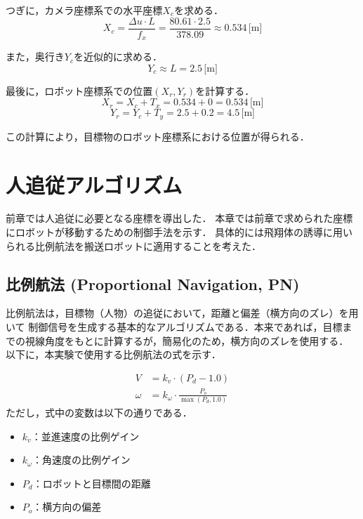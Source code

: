 つぎに，カメラ座標系での水平座標$X_c$を求める．
\begin{equation}
    X_c = \frac{\Delta u \cdot L}{f_x} = \frac{80.61 \cdot 2.5}{378.09} \approx 0.534 \, \text{[m]}
\end{equation}

また，奥行き$Y_c$を近似的に求める．
\begin{equation}
    Y_c \approx L = 2.5 \, \text{[m]}
\end{equation}

最後に，ロボット座標系での位置$(X_r, Y_r)$を計算する．
\begin{equation}
    X_r = X_c + T_x = 0.534 +0 = 0.534 \, \text{[m]}
\end{equation}
\begin{equation}
    Y_r = Y_c + T_y = 2.5 + 0.2 = 4.5 \, \text{[m]}
\end{equation}

この計算により，目標物のロボット座標系における位置が得られる．

\newpage

\section{人追従アルゴリズム}
前章では人追従に必要となる座標を導出した．
本章では前章で求められた座標にロボットが移動するための制御手法を示す．
具体的には飛翔体の誘導に用いられる比例航法を搬送ロボットに適用することを考えた．

\subsection{比例航法 (Proportional Navigation, PN)}
比例航法は，目標物（人物）の追従において，距離と偏差（横方向のズレ）を用いて
制御信号を生成する基本的なアルゴリズムである．本来であれば，目標までの視線角度をもとに計算するが，簡易化のため，横方向のズレを使用する．
以下に，本実験で使用する比例航法の式を示す．

\begin{align}
    V      & = k_v \cdot (P_d - 1.0)                     \\
    \omega & = k_\omega \cdot \frac{P_o}{\max(P_d, 1.0)}
\end{align}
ただし，式中の変数は以下の通りである．
\begin{itemize}
    \item \(k_v\)：並進速度の比例ゲイン
    \item \(k_\omega\)：角速度の比例ゲイン
    \item \(P_d\)：ロボットと目標間の距離
    \item \(P_o\)：横方向の偏差
\end{itemize}

